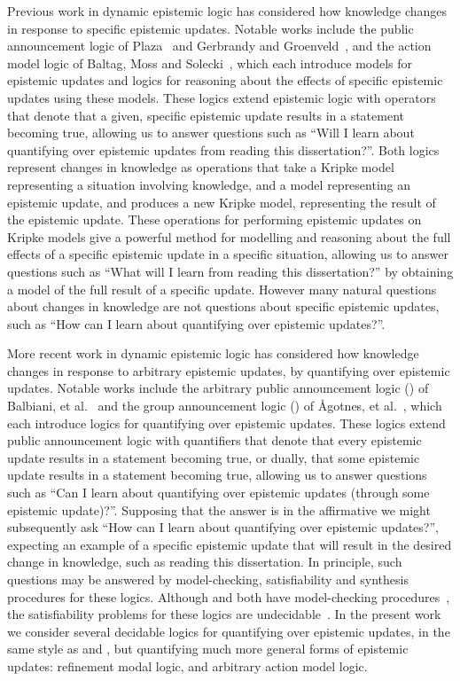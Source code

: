 Previous work in dynamic epistemic logic has considered how knowledge changes in response to specific epistemic updates.
Notable works include the public announcement logic of Plaza~\cite{plaza:1989} and Gerbrandy and Groenveld~\cite{gerbrandy:1997}, and the action model logic of Baltag, Moss and Solecki~\cite{baltag:1998,baltag:2004}, which each introduce models for epistemic updates and logics for reasoning about the effects of specific epistemic updates using these models.
These logics extend epistemic logic with operators that denote that a given, specific epistemic update results in a statement becoming true, allowing us to answer questions such as ``Will I learn about quantifying over epistemic updates from reading this dissertation?''.
Both logics represent changes in knowledge as operations that take a Kripke model representing a situation involving knowledge, and a model representing an epistemic update, and produces a new Kripke model, representing the result of the epistemic update.
These operations for performing epistemic updates on Kripke models give a powerful method for modelling and reasoning about the full effects of a specific epistemic update in a specific situation, allowing us to answer questions such as ``What will I learn from reading this dissertation?'' by obtaining a model of the full result of a specific update.
However many natural questions about changes in knowledge are not questions about specific epistemic updates, such as ``How can I learn about quantifying over epistemic updates?''.

More recent work in dynamic epistemic logic has considered how knowledge changes in response to arbitrary epistemic updates, by quantifying over epistemic updates.
Notable works include the arbitrary public announcement logic (\logicApal{}) of Balbiani, et al.~\cite{balbiani:2007} and the group announcement logic (\logicGal{}) of {\AA}gotnes, et al.~\cite{agotnes:2008,agotnes:2010}, which each introduce logics for quantifying over epistemic updates.
These logics extend public announcement logic with quantifiers that denote that every epistemic update results in a statement becoming true, or dually, that some epistemic update results in a statement becoming true, allowing us to answer questions such as ``Can I learn about quantifying over epistemic updates (through some epistemic update)?''.
Supposing that the answer is in the affirmative we might subsequently ask ``How can I learn about quantifying over epistemic updates?'', expecting an example of a specific epistemic update that will result in the desired change in knowledge, such as reading this dissertation.
In principle, such questions may be answered by model-checking, satisfiability and synthesis procedures for these logics.
Although \logicApal{} and \logicGal{} both have model-checking procedures~\cite{agotnes:2010}, the satisfiability problems for these logics are undecidable~\cite{agotnes:2014}.
In the present work we consider several decidable logics for quantifying over epistemic updates, in the same style as \logicApal{} and \logicGal{}, but quantifying much more general forms of epistemic updates: refinement modal logic, and arbitrary action model logic.

